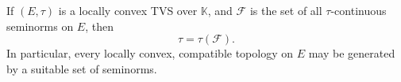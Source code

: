 If $(E, \tau)$ is a locally convex TVS over $\mathbb{K}$, and $\mathcal{F}$ is the set of all $\tau$-continuous seminorms on $E$, then
$$\tau = \tau(\mathcal{F}).$$
In particular, every locally convex, compatible topology on $E$ may be generated by a suitable set of seminorms.
